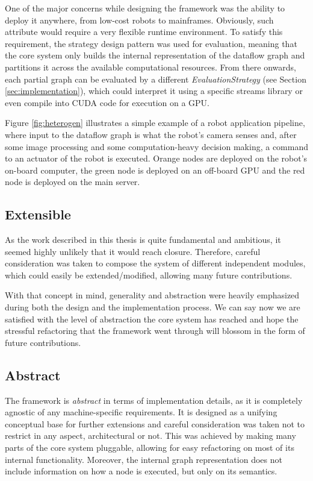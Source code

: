 \documentclass[sigplan,review,anonymous]{acmart}\settopmatter{printfolios=true,printacmref=false}
\begin{document}
One of the major concerns while designing the framework was the ability to deploy it anywhere, from low-cost robots to mainframes. Obviously, such attribute would require a very flexible runtime environment. To satisfy this requirement, the strategy design pattern was used for evaluation, meaning that the core system only builds the internal representation of the dataflow graph and partitions it across the available computational resources. From there onwards, each partial graph can be evaluated by a different \textit{EvaluationStrategy} (see Section \ref{sec:implementation}), which could interpret it using a specific streams library or even compile into CUDA code for execution on a GPU.

Figure \ref{fig:heterogen} illustrates a simple example of a robot application pipeline, where input to the dataflow graph is what the robot's camera senses and, after some image processing and some computation-heavy decision making, a command to an actuator of the robot is executed. Orange nodes are deployed on the robot's on-board computer, the green node is deployed on an off-board GPU and the red node is deployed on the main server.


\subsection{Extensible}

As the work described in this thesis is quite fundamental and ambitious, it seemed highly unlikely that it would reach closure. Therefore, careful consideration was taken to compose the system of different independent modules, which could easily be extended/modified, allowing many future contributions.

With that concept in mind, generality and abstraction were heavily emphasized during both the design and the implementation process. We can say now we are satisfied with the level of abstraction the core system has reached and hope the stressful refactoring that the framework went through will blossom in the form of future contributions.

\subsection{Abstract}

The framework is \textit{abstract} in terms of implementation details, as it is completely agnostic of any machine-specific requirements. It is designed as a unifying conceptual base for further extensions and careful consideration was taken not to restrict in any aspect, architectural or not. This was achieved by making many parts of the core system pluggable, allowing for easy refactoring on most of its internal functionality. Moreover, the internal graph representation does not include information on how a node is executed, but only on its semantics.
\end{document}
